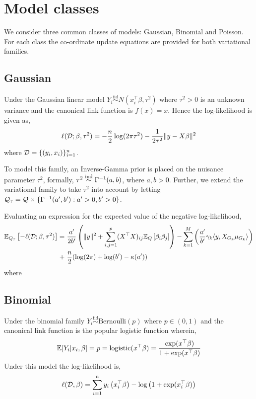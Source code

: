 \documentclass[12pt]{article}
\begin{document}
\section*{Model classes}

We consider three common classes of models: Gaussian, Binomial and Poisson. For each class the co-ordinate update equations are provided for both variational families.


\subsection*{Gaussian}

Under the Gaussian linear model $Y_i \overset{\text{iid}}{\sim} N(x_i^\top \beta, \tau^2)$ where $\tau^2 > 0$ is an unknown variance and the canonical link function is $f(x) = x$. Hence the log-likelihood is given as,
\begin{equation} \label{eq:log-likelihood}
    \ell(\mathcal{D}; \beta, \tau^2) = - \frac{n}{2}\log(2\pi\tau^2) - \frac{1}{2\tau^2} \| y - X \beta \|^2 
\end{equation}
where $\mathcal{D} = \{ (y_i, x_i) \}_{i=1}^n$.

To model this family, an Inverse-Gamma prior is placed on the nuisance parameter $\tau^2$, formally, $\tau^2 \overset{\text{ind}}{\sim} \Gamma^{-1}(a, b)$, where $a, b > 0$. Further, we extend the variational family to take $\tau^2$ into account by letting $\mathcal{Q}_\tau = \mathcal{Q} \times \{ \Gamma^{-1}(a', b') : a' > 0, b' > 0 \}$. 

Evaluating an expression for the expected value of the negative log-likelihood,
\begin{equation}
\begin{aligned}
\E_{Q_\tau} \left[ - \ell(\D; \beta, \tau^2) \right]
= &\ 
    \frac{a'}{2b'} \left( \| y \|^2  
+ 
    \sum_{i,j=1}^p(X^\top X)_{ij} \E_Q \left[ \beta_i \beta_j \right] \right)
-
    \sum_{k=1}^M \left( \frac{a'}{b'} \gamma_k \langle y, X_{G_k} \mu_{G_k} \rangle \right) \\
+ &\ 
    \frac{n}{2} (\log(2 \pi) + \log(b') - \kappa(a'))
\end{aligned}
\end{equation}
where



\newpage
\subsection*{Binomial}

Under the binomial family $Y_i \overset{\text{iid}}{\sim} \text{Bernoulli}(p)$ where $p \in (0, 1)$ and the canonical link function is the popular logistic function wherein,
\begin{equation}
    \mathbb{E}[Y_i | x_i, \beta] = p = \text{logistic}(x^\top \beta) =  \frac{\exp(x^\top \beta)}{1 + \exp(x^\top \beta)}
\end{equation}
Under this model the log-likelihood is,
\begin{equation}
    \ell(\mathcal{D}, \beta) 
    = 
	\sum_{i=1}^n  y_i \left( x_i^\top \beta \right) 
	- \log \left(1 + \exp(x_i^\top \beta) \right)
\end{equation}
\end{document}
